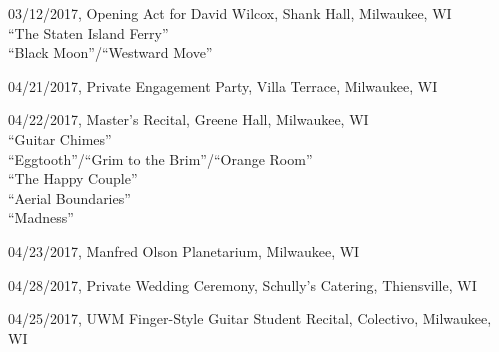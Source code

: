 \documentclass[12pt]{article}
\begin{document}
\begin{flushleft}
  \vspace{.15in}

  03/12/2017, Opening Act for David Wilcox, Shank Hall, Milwaukee, WI\\
  \hspace{.25in}``The Staten Island Ferry''\\
  \hspace{.25in}``Black Moon''/``Westward Move''\\

  \vspace{.15in}

  04/21/2017, Private Engagement Party, Villa Terrace, Milwaukee, WI\\

  \vspace{.15in}

  04/22/2017, Master's Recital, Greene Hall, Milwaukee, WI\\
  \hspace{.25in} ``Guitar Chimes''\\
  \hspace{.25in} ``Eggtooth''/``Grim to the Brim''/``Orange Room''\\
  \hspace{.25in} ``The Happy Couple''\\
  \hspace{.25in} ``Aerial Boundaries''\\
  \hspace{.25in} ``Madness''\\  

  \vspace{.15in}

  04/23/2017, Manfred Olson Planetarium, Milwaukee, WI\\

  \vspace{.15in}

  04/28/2017, Private Wedding Ceremony, Schully's Catering, Thiensville, WI\\

  \vspace{.15in}

  04/25/2017, UWM Finger-Style Guitar Student Recital, Colectivo, Milwaukee, WI\\
  
  
\end{flushleft}
\end{document}
